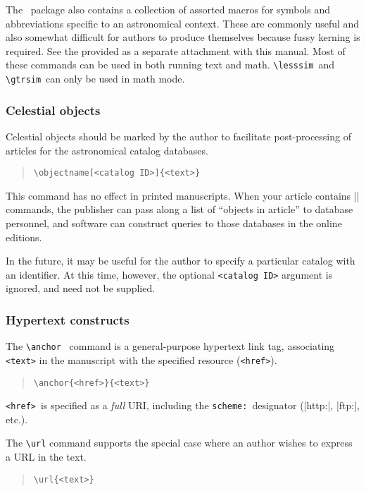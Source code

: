 \documentclass[preprint2]{aastex}
\begin{document}
The \aastex\ package also contains a collection of assorted macros 
for symbols and abbreviations specific to an astronomical context. 
These are commonly useful and also somewhat difficult for authors 
to produce themselves because fussy kerning is required. 
See the  provided as 
a separate attachment with this manual. 
Most of these commands can be used in both running text and math. 
\verb"\lesssim"\  and \verb"\gtrsim"\  can only be used in math mode. 
 
\subsubsection{Celestial objects} 
 
Celestial objects should be marked by the author to facilitate 
post-processing of articles for the astronomical catalog databases. 
\begin{quote} 
\begin{verbatim} 
\objectname[<catalog ID>]{<text>} 
\end{verbatim} 
\end{quote} 
This command has no effect in printed manuscripts. 
When your article contains |\objectname| commands, 
the publisher can pass along a list of ``objects in article'' 
to database personnel, and software can construct queries 
to those databases in the online editions. 
 
In the future, it may be useful for the author to specify a 
particular catalog with an identifier. 
At this time, however, the optional \verb"<catalog ID>" 
argument is ignored, and need not be supplied. 
 
\subsubsection{Hypertext constructs} 
 
The \verb"\anchor"\ \label{cmd-anchor} command is a general-purpose 
hypertext link tag, associating \verb"<text>" in the manuscript with 
the specified resource (\verb"<href>"). 
\begin{quote} 
\begin{verbatim} 
\anchor{<href>}{<text>} 
\end{verbatim} 
\end{quote} 
\verb"<href>"\ is specified as a \emph{full} URI, including the 
\verb"scheme:"\  designator (|http:|, |ftp:|, etc.). 
 
The \verb"\url" command supports the special case where an author 
wishes to express a URL in the text. 
\begin{quote} 
\begin{verbatim} 
\url{<text>} 
\end{verbatim} 
\end{quote} 
 
\end{document}
